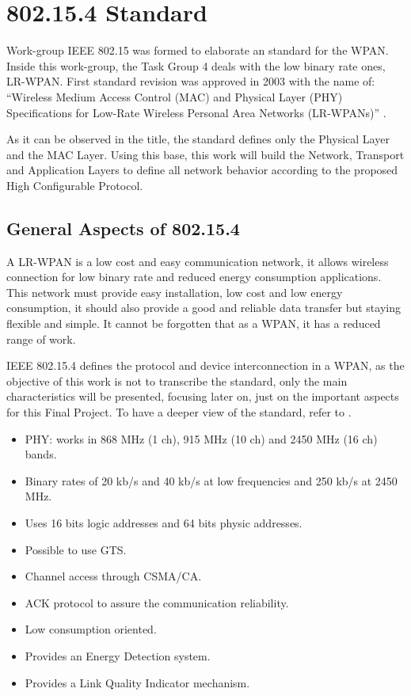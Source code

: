 \chapter{802.15.4 Standard}
\label{chap:802154standard}

Work-group \ac{IEEE} 802.15 was formed to elaborate an standard for the \ac{WPAN}. Inside this work-group, the Task Group 4 
deals with the low binary rate ones, \ac{LR-WPAN}. First standard revision was approved in 2003 with the name of: ``Wireless 
Medium Access Control (MAC) and Physical Layer (PHY) Specifications for Low-Rate Wireless Personal Area Networks (LR-WPANs)'' 
\cite{IEEE802.15.4-2003}.

As it can be observed in the title, the standard defines only the Physical Layer and the \ac{MAC} Layer. Using this base, 
this work will build the Network, Transport and Application Layers to define all network behavior according to the proposed 
High Configurable Protocol.

\section{General Aspects of 802.15.4}

A \ac{LR-WPAN} is a low cost and easy communication network, it allows wireless connection for low binary rate and reduced 
energy consumption applications. This network must provide easy installation, low cost and low energy consumption, it should
also provide a good and reliable data transfer but staying flexible and simple. It cannot be forgotten that as a \ac{WPAN}, it
has a reduced range of work.

\ac{IEEE} 802.15.4 defines the protocol and device interconnection in a \ac{WPAN}, as the objective of this work is not to 
transcribe the standard, only the main characteristics will be presented, focusing later on, just on the important aspects
for this Final Project. To have a deeper view of the standard, refer to \cite{IEEE802.15.4-2003}.

\begin{itemize}
 \item \ac{PHY}: works in 868 MHz (1 ch), 915 MHz (10 ch) and 2450 MHz (16 ch) bands.
 \item Binary rates of 20 kb/s and 40 kb/s at low frequencies and 250 kb/s at 2450 MHz.
 \item Uses 16 bits logic addresses and 64 bits physic addresses.
 \item Possible to use \ac{GTS}.
 \item Channel access through \ac{CSMA/CA}.
 \item \ac{ACK} protocol to assure the communication reliability.
 \item Low consumption oriented.
 \item Provides an Energy Detection system.
 \item Provides a Link Quality Indicator mechanism.
\end{itemize}

